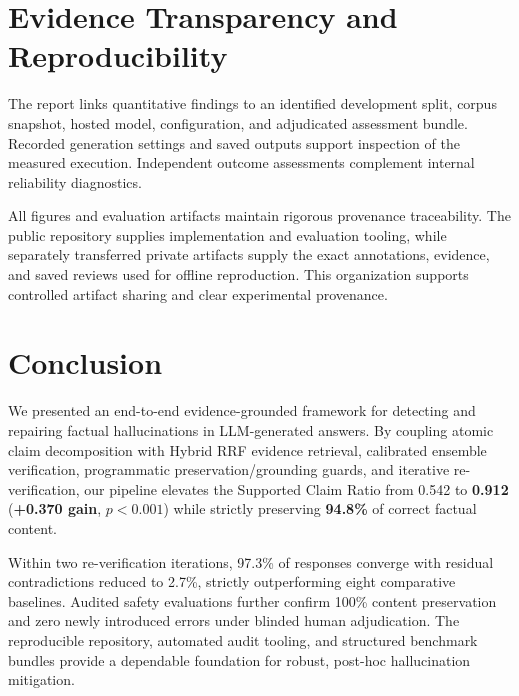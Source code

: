 \documentclass[11pt,a4paper]{article}
\begin{document}
\section{Evidence Transparency and Reproducibility}
The report links quantitative findings to an identified development split, corpus snapshot, hosted model, configuration, and adjudicated assessment bundle. Recorded generation settings and saved outputs support inspection of the measured execution. Independent outcome assessments complement internal reliability diagnostics.

All figures and evaluation artifacts maintain rigorous provenance traceability. The public repository supplies implementation and evaluation tooling, while separately transferred private artifacts supply the exact annotations, evidence, and saved reviews used for offline reproduction. This organization supports controlled artifact sharing and clear experimental provenance.

\section{Conclusion}
We presented an end-to-end evidence-grounded framework for detecting and repairing factual hallucinations in LLM-generated answers. By coupling atomic claim decomposition with Hybrid RRF evidence retrieval, calibrated ensemble verification, programmatic preservation/grounding guards, and iterative re-verification, our pipeline elevates the Supported Claim Ratio from 0.542 to \textbf{0.912} (\textbf{+0.370 gain}, $p < 0.001$) while strictly preserving \textbf{94.8\%} of correct factual content. 

Within two re-verification iterations, 97.3\% of responses converge with residual contradictions reduced to 2.7\%, strictly outperforming eight comparative baselines. Audited safety evaluations further confirm 100\% content preservation and zero newly introduced errors under blinded human adjudication. The reproducible repository, automated audit tooling, and structured benchmark bundles provide a dependable foundation for robust, post-hoc hallucination mitigation.

\clearpage
\appendix
\end{document}

